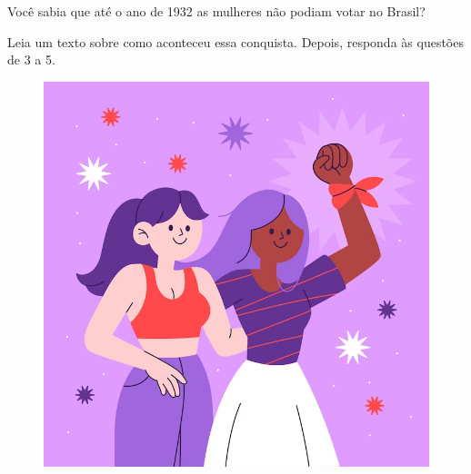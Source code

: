 
\noindent{}Você sabia que até o ano de 1932 as mulheres não podiam votar no Brasil?

\noindent{}Leia um texto sobre como aconteceu essa conquista. Depois, responda às questões de 3 a 5.

\begin{figure}[htpb!]
\centering
\includegraphics[width=.5\textwidth]{./imgs/img49.png}
\caption{}
\end{figure}

